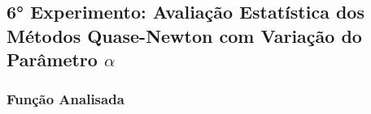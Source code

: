 \subsection{6° Experimento: Avaliação Estatística dos Métodos Quase-Newton com Variação do Parâmetro $\alpha$}
    \subsubsection{Função Analisada}

\newpage